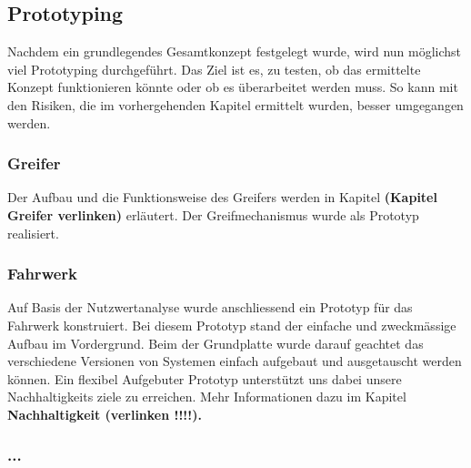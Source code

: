 \subsection{Prototyping}

Nachdem ein grundlegendes Gesamtkonzept festgelegt wurde, wird nun möglichst viel Prototyping durchgeführt. Das Ziel ist es, zu testen, ob das ermittelte Konzept funktionieren könnte oder ob es überarbeitet werden muss. So kann mit den Risiken, die im vorhergehenden Kapitel ermittelt wurden, besser umgegangen werden.

\subsubsection{Greifer}

Der Aufbau und die Funktionsweise des Greifers werden in Kapitel \textbf{(Kapitel Greifer verlinken)} erläutert. Der Greifmechanismus wurde als Prototyp realisiert.



\subsubsection{Fahrwerk}

Auf Basis der Nutzwertanalyse wurde anschliessend ein Prototyp für das Fahrwerk konstruiert. Bei diesem Prototyp stand der einfache und zweckmässige Aufbau im Vordergrund. Beim der Grundplatte wurde darauf geachtet das verschiedene  Versionen von Systemen einfach aufgebaut und ausgetauscht werden können. Ein flexibel Aufgebuter Prototyp unterstützt uns dabei unsere Nachhaltigkeits ziele zu erreichen. Mehr Informationen dazu im Kapitel \textbf{Nachhaltigkeit (verlinken !!!!).} 

\subsubsection{...}

